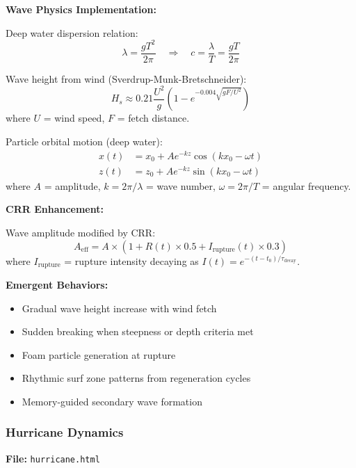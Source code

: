 \documentclass[11pt,a4paper]{article}
\theoremstyle{definition}
\theoremstyle{remark}
\begin{document}
\textbf{Wave Physics Implementation:}

Deep water dispersion relation:
\begin{equation}
\lambda = \frac{g T^2}{2\pi} \quad \Rightarrow \quad c = \frac{\lambda}{T} = \frac{gT}{2\pi}
\end{equation}

Wave height from wind (Sverdrup-Munk-Bretschneider):
\begin{equation}
H_s \approx 0.21 \frac{U^2}{g} \left(1 - e^{-0.004\sqrt{gF/U^2}}\right)
\end{equation}
where $U$ = wind speed, $F$ = fetch distance.

Particle orbital motion (deep water):
\begin{equation}
\begin{aligned}
x(t) &= x_0 + A e^{-kz} \cos(kx_0 - \omega t) \\
z(t) &= z_0 + A e^{-kz} \sin(kx_0 - \omega t)
\end{aligned}
\end{equation}
where $A$ = amplitude, $k = 2\pi/\lambda$ = wave number, $\omega = 2\pi/T$ = angular frequency.

\textbf{CRR Enhancement:}

Wave amplitude modified by CRR:
\begin{equation}
A_{\text{eff}} = A \times \left(1 + R(t) \times 0.5 + I_{\text{rupture}}(t) \times 0.3\right)
\end{equation}
where $I_{\text{rupture}}$ = rupture intensity decaying as $I(t) = e^{-(t-t_0)/\tau_{\text{decay}}}$.

\textbf{Emergent Behaviors:}
\begin{itemize}
\item Gradual wave height increase with wind fetch
\item Sudden breaking when steepness or depth criteria met
\item Foam particle generation at rupture
\item Rhythmic surf zone patterns from regeneration cycles
\item Memory-guided secondary wave formation
\end{itemize}

\subsubsection{Hurricane Dynamics}

\textbf{File:} \texttt{hurricane.html}
\end{document}
